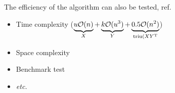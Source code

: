 \noindent The efficiency of the algorithm can also be tested, ref. \cite{golub2013matrix, hunger2005floating}
\begin{itemize}
    \item Time complexity ($\underbrace{u\mathcal{O}(n)}_{X} + \underbrace{k\mathcal{O}(u^3)}_{Y} + \underbrace{0.5\mathcal{O}(n^2)}_{\mathop{\mathrm{triu}}(XY^{\mathrm{T}}}$) \\
    \item Space complexity \\
    \item Benchmark test \\
    \item \textit{etc.}
\end{itemize}


